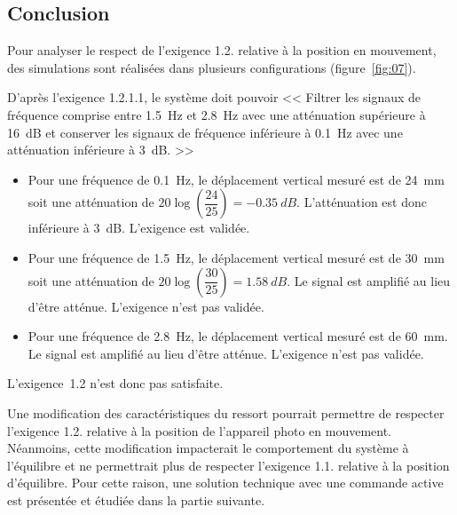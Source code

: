 \subsection{Conclusion}
\ifprof
\else
Pour analyser le respect de l'exigence 1.2. relative à la position en mouvement, des simulations sont réalisées dans plusieurs configurations (figure~\ref{fig:07}).
\fi

\ifprof
\begin{corrige}
D'après l’exigence 1.2.1.1, le système doit pouvoir << Filtrer les signaux de fréquence comprise entre \SI{1,5}{Hz} et \SI{2,8}{Hz} avec une atténuation supérieure à \SI{16}{dB} et conserver les signaux
de fréquence inférieure à \SI{0,1}{Hz} avec une atténuation inférieure à \SI{3}{dB}. >>

\begin{itemize}
\item Pour une fréquence de \SI{0,1}{Hz}, le déplacement vertical mesuré est de \SI{24}{mm} soit une atténuation de $20\log \left( \dfrac{24}{25}\right) = -\SI{0,35}{dB}$. L'atténuation est donc inférieure à \SI{3}{dB}. L'exigence est validée.

\item Pour une fréquence de \SI{1,5}{Hz}, le déplacement vertical mesuré est de \SI{30}{mm} soit une atténuation de $20\log \left( \dfrac{30}{25}\right) = \SI{1,58}{dB}$. Le signal est amplifié au lieu d'être atténue. L'exigence n'est pas validée.

\item Pour une fréquence de \SI{2,8}{Hz}, le déplacement vertical mesuré est de \SI{60}{mm}. Le signal est amplifié au lieu d'être atténue. L'exigence n'est pas validée.

\end{itemize}

L'exigence~1.2 n'est donc pas satisfaite. 

\end{corrige}
\else
\fi

\ifprof
\else
Une modification des caractéristiques du ressort pourrait permettre de respecter l'exigence 1.2. relative à la position de l'appareil photo en mouvement. Néanmoins, cette modification impacterait le comportement du système à l'équilibre et ne permettrait plus de respecter l'exigence 1.1. relative à la position d'équilibre. Pour cette raison, une solution technique avec une commande active est présentée et étudiée dans la partie suivante.


